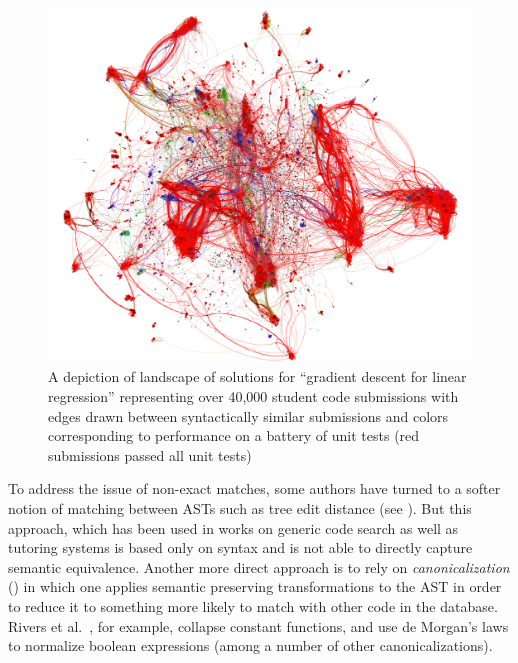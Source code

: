 \begin{figure}[t!]
\includegraphics[width=1.0\textwidth]{img/machineLearningWeb}
\caption[Depiction of Machine Learning Submissions]{A depiction of landscape of solutions for “gradient descent for linear regression” representing over
40,000 student code submissions with edges drawn between syntactically similar submissions and
colors corresponding to performance on a battery of unit tests (red submissions passed all unit
tests)}
\label{fig:submissionWeb}
\end{figure}

To address the issue of non-exact matches, some authors have turned to a softer notion of matching between ASTs
such as tree edit distance (see \cite{shasha94}). But this approach, which has been used in works on generic
code search as well as tutoring systems \cite{kim10,huang13,rivers13} is based only on syntax
and is not able to directly capture semantic equivalence.
Another more direct approach is to rely on \emph{canonicalization} (\cite{paul94,xu03,rivers12,rivers13}) in which one
applies semantic preserving transformations to the AST in order to reduce it to something more likely to match with other code in the database.
Rivers et al.~\cite{rivers12}, for example, collapse constant functions, and use de Morgan's laws to normalize boolean expressions (among a number of 
other canonicalizations).

